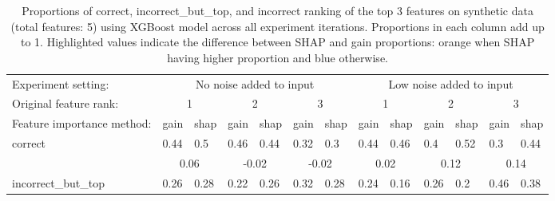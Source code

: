 

\begin{table*}[t]
\centering
  \caption{Proportions of correct, incorrect\_but\_top, and incorrect ranking of the top 3 features on synthetic data (total features: 5) using XGBoost model across all experiment iterations. Proportions in each column add up to 1. Highlighted values indicate the difference between SHAP and gain proportions: orange when SHAP having higher proportion and blue otherwise.}
  \label{tab:correctness}
  \scriptsize
\begin{tabular}{l|llllll|llllll}
    \toprule
  Experiment setting:                    & \multicolumn{6}{c|}{No noise added to   input}                                     & \multicolumn{6}{c}{Low noise added to   input}                                    \\
Original feature rank: & \multicolumn{2}{c}{1}     & \multicolumn{2}{c}{2}     & \multicolumn{2}{c|}{3}     & \multicolumn{2}{c}{1}     & \multicolumn{2}{c}{2}     & \multicolumn{2}{c}{3}     \\
Feature importance method:                      & gain         & shap       & gain        & shap        & gain        & shap        & gain         & shap       & gain         & shap       & gain          & shap      \\
                      \midrule
\multirow{2}{*}{correct}               & 0.44         & 0.5        & 0.46        & 0.44        & 0.32        & 0.3         & 0.44         & 0.46       & 0.4          & 0.52       & 0.3           & 0.44      \\
                      & \multicolumn{2}{c}{\cellcolor{orange}0.06}  & \multicolumn{2}{c}{\cellcolor{babyblue}-0.02} & \multicolumn{2}{c|}{\cellcolor{babyblue}-0.02} & \multicolumn{2}{c}{\cellcolor{orange}0.02}  & \multicolumn{2}{c}{\cellcolor{orange}0.12}  & \multicolumn{2}{c}{\cellcolor{orange}0.14}  \\
\multirow{2}{*}{incorrect\_but\_top}   & 0.26         & 0.28       & 0.22        & 0.26        & 0.32        & 0.28        & 0.24         & 0.16       & 0.26         & 0.2        & 0.46          & 0.38      \\

\end{tabular}
\end{table*}
